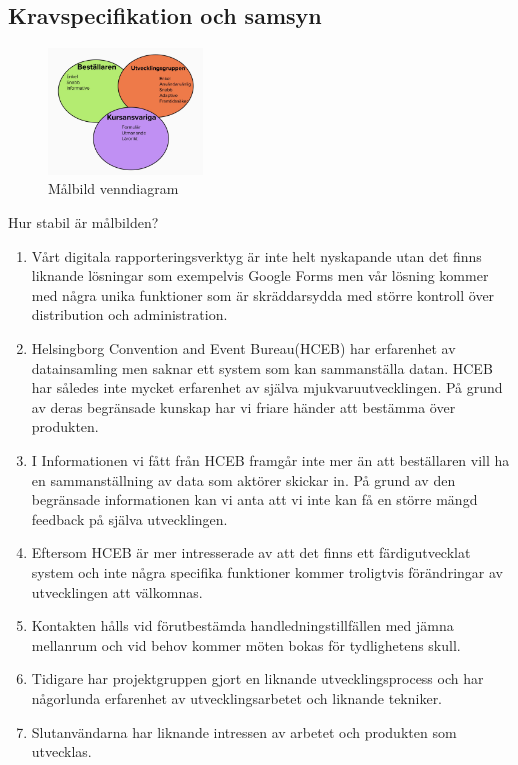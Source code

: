 \documentclass[12pt]{article}
\begin{document}
\subsection{Kravspecifikation och samsyn}

\begin{figure}[htp]
    \centering
    \includegraphics[width = 155px]{malbild.jpg}
    \caption{Målbild venndiagram}
    \label{fig:Målbild}
\end{figure}

Hur stabil är målbilden?

\begin{enumerate}
	\item Vårt digitala rapporteringsverktyg är inte helt nyskapande utan det finns liknande
lösningar som exempelvis Google Forms men vår lösning kommer med några unika
funktioner som är skräddarsydda med större kontroll över distribution och
administration. 

	 \item Helsingborg Convention and Event Bureau(HCEB) har erfarenhet av datainsamling
men saknar ett system som kan sammanställa datan. HCEB har således inte
mycket erfarenhet av själva mjukvaruutvecklingen. På grund av deras begränsade kunskap har vi friare händer att bestämma över produkten.

\item I Informationen vi fått från HCEB framgår inte mer än att beställaren vill ha en sammanställning av data som aktörer skickar in. På grund av den begränsade informationen kan vi anta att vi inte kan få en större mängd feedback på själva utvecklingen.

\item Eftersom HCEB är mer intresserade av att det finns ett färdigutvecklat system och
inte några specifika funktioner kommer troligtvis förändringar av utvecklingen att
välkomnas.

\item Kontakten hålls vid förutbestämda handledningstillfällen med jämna mellanrum och
vid behov kommer möten bokas för tydlighetens skull.

\item Tidigare har projektgruppen gjort en liknande utvecklingsprocess och har någorlunda
erfarenhet av utvecklingsarbetet och liknande tekniker.

\item Slutanvändarna har liknande intressen av arbetet och produkten som utvecklas.
\end{enumerate}
\end{document}
